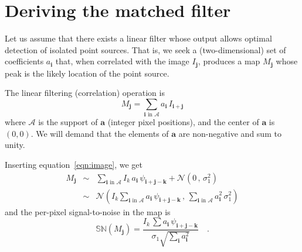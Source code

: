 \documentclass[11pt,letterpaper,linenumbers]{aastex63}
\newcommand{\equationname}{equation}
\newcommand{\eqnref}[1]{\mbox{\equationname~\ref{#1}}}
\newcommand{\drawnfrom}{\sim}
\newcommand{\gaussianN}{\mathcal{N}}
\newcommand{\gaussx}[2]{\gaussianN\!\left(#1 \, , \, #2\right)}
\newcommand{\psf}{\psi}
\newcommand{\psfat}[1]{\psf_{#1}}
\newcommand{\signoise}{[S/N]}
\newcommand{\snr}[1]{\mathbb{SN}(#1)}
\renewcommand{\vec}[1]{\boldsymbol{#1}}
\newcommand{\avec}{\vec{a}}
\newcommand{\ivec}{\vec{i}}
\newcommand{\jvec}{\vec{j}}
\newcommand{\kvec}{\vec{k}}
\newcommand{\coord}[2]{(#1, #2)}
\newcommand{\iina}{\ivec \,\, \mathrm{in} \,\, \mathcal{A}}
\begin{document}
% 
% 
% 
% 
% 
% 

\appendix

\section{Deriving the matched filter}
\label{app:lindet}

Let us assume that there exists a linear filter whose output allows
optimal detection of isolated point sources.  That is, we seek a
(two-dimensional) set of coefficients $a_{\ivec}$ that, when
correlated with the image $I_{\jvec}$, produces a map $M_{\jvec}$
whose peak is the likely location of the point source.


The linear filtering (correlation) operation is
\begin{equation}
M_{\jvec} = \sum_{\iina} a_{\ivec} \, I_{\ivec + \jvec}
\label{eq:detmap1}
\end{equation}
where $\mathcal{A}$ is the support of $\avec$ (integer pixel
positions), and the center of $\avec$ is $\coord{0}{0}$.  We will
demand that the elements of $\avec$ are non-negative and sum to unity.

Inserting \eqnref{eqn:image}, we get
\begin{eqnarray}
M_{\jvec} &\drawnfrom& \sum_{\iina}
  I_k \, a_{\ivec} \, \psfat{\ivec + \jvec - \kvec} + \gaussx{0}{\sigma_1^2}
  \\
&\drawnfrom& \gaussx{ I_k \sum_{\iina} a_{\ivec} \, \psfat{\ivec + \jvec - \kvec}}%
    {\sum_{\iina} a_{\ivec}^2 \, \sigma_1^2}
\end{eqnarray}
and the per-pixel signal-to-noise in the map is
\begin{equation}
  \snr{M_{\jvec}} = \frac{I_k \, \sum a_{\ivec} \, \psfat{\ivec + \jvec - \kvec}}{\sigma_1 \sqrt{\sum_{\ivec} a_{\ivec}^2}} \quad .
  \label{eq:detmapsn1}
\end{equation}
\end{document}
